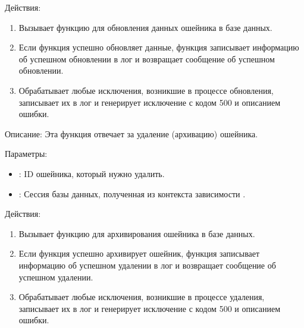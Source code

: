 \documentclass[letterpaper,10pt,russian]{sphinxmanual}
\begin{document}
\sphinxAtStartPar
Действия:
\begin{enumerate}
%
\item {} 
\sphinxAtStartPar
Вызывает функцию  для обновления данных ошейника в базе данных.

\item {} 
\sphinxAtStartPar
Если функция  успешно обновляет данные, функция записывает информацию об успешном обновлении в лог и возвращает сообщение об успешном обновлении.

\item {} 
\sphinxAtStartPar
Обрабатывает любые исключения, возникшие в процессе обновления, записывает их в лог и генерирует исключение  с кодом 500 и описанием ошибки.

\end{enumerate}

\sphinxAtStartPar
{}

\sphinxAtStartPar
Описание: Эта функция отвечает за удаление (архивацию) ошейника.

\sphinxAtStartPar
Параметры:
\begin{itemize}
\item {} 
\sphinxAtStartPar
{}: ID ошейника, который нужно удалить.

\item {} 
\sphinxAtStartPar
{}: Сессия базы данных, полученная из контекста зависимости .

\end{itemize}

\sphinxAtStartPar
Действия:
\begin{enumerate}
%
\item {} 
\sphinxAtStartPar
Вызывает функцию  для архивирования ошейника в базе данных.

\item {} 
\sphinxAtStartPar
Если функция  успешно архивирует ошейник, функция записывает информацию об успешном удалении в лог и возвращает сообщение об успешном удалении.

\item {} 
\sphinxAtStartPar
Обрабатывает любые исключения, возникшие в процессе удаления, записывает их в лог и генерирует исключение  с кодом 500 и описанием ошибки.

\end{enumerate}
\end{document}
